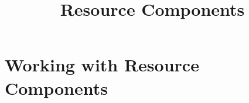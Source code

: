 \documentclass{report}
\begin{document}
\title{Resource Components}
\maketitle

\chapter{Working with Resource Components}

\end{document}
